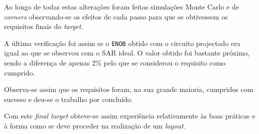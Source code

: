 \documentclass[11pt]{article}
\numberwithin{equation}{section}
\begin{document}
Ao longo de todas estas alterações foram feitas simulações Monte Carlo e de \textit{corners} observando-se os efeitos de cada passo para que se obtivessem os requisitos finais do \textit{target}.

A última verificação foi assim se o \texttt{ENOB} obtido com o circuito projectado era igual ao que se observou com o SAR ideal. O valor obtido foi bastante próximo, sendo a diferença de apenas 2\% pelo que se considerou o requisito como cumprido.

Observa-se assim que os requisitos foram, na sua grande maioria, cumpridos com sucesso e deu-se o trabalho por concluído.

Com este \textit{final target} obteve-se assim experiência relativamente às boas práticas e à forma como se deve proceder na realização de um \textit{layout}.
\end{document}
